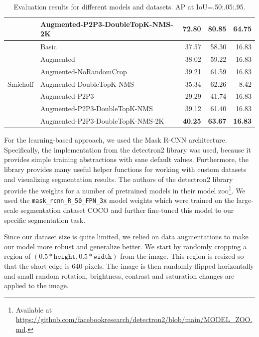 \documentclass[final]{cvpr}
\begin{document}
\begin{table}[t!]
\begin{tabular}{llrrr}
                                        & Augmented-P2P3-DoubleTopK-NMS-2K & 72.80 & 80.85 & 64.75 \\
        \hline
        \multirow{7}{*}{Smíchoff} & Basic & 37.57 & 58.30 & 16.83 \\
                                        & Augmented & 38.02 & 59.22 & 16.83 \\
                                        & Augmented-NoRandomCrop & 39.21 & 61.59 & 16.83 \\
                                        & Augmented-DoubleTopK-NMS & 35.34 & 62.26 & 8.42 \\
                                        & Augmented-P2P3 & 29.29 & 41.74 & 16.83 \\
                                        & Augmented-P2P3-DoubleTopK-NMS & 39.12 & 61.40 & 16.83 \\
                                        & Augmented-P2P3-DoubleTopK-NMS-2K & \textbf{40.25} & \textbf{63.67} & \textbf{16.83} \\ \bottomrule
                                     
    \end{tabular}
    \caption{ Evaluation results for different models and datasets. AP at IoU=.50:.05:.95.}
    \label{tab:results_hold_detection_ml}
\end{table}


For the learning-based approach, we used the Mask R-CNN \cite{maskrcnn} architecture.
Specifically, the implementation from the detectron2 \cite{wu2019detectron2} library was used, because it provides simple training abstractions with sane default values. Furthermore, the library provides many useful helper functions for working with custom datasets and visualizing segmentation results.
The authors of the detectron2 library provide the weights for a number of pretrained models in their model zoo\footnote{Available at \url{https://github.com/facebookresearch/detectron2/blob/main/MODEL_ZOO.md}.}.
We used the \texttt{mask\_rcnn\_R\_50\_FPN\_3x} model weights which were trained on the large-scale segmentation dataset COCO \cite{coco} and further fine-tuned this model to our specific segmentation task.

Since our dataset size is quite limited, we relied on data augmentations to make our model more robust and generalize better.
We start by randomly cropping a region of $(0.5 * \texttt{height}, 0.5 * \texttt{width})$ from the image. This region is resized so that the short edge is 640 pixels.
The image is then randomly flipped horizontally and small random rotation, brightness, contrast and saturation changes are applied to the image.
\end{document}
